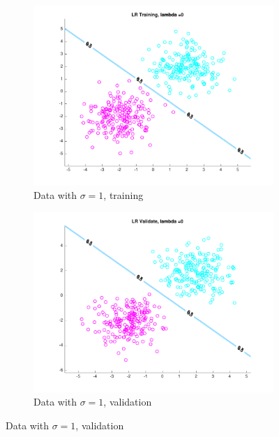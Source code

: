 \begin{figure}[h!]
\centering
    \begin{subfigure}[b]{0.4\textwidth}
	\includegraphics[scale=0.4]{hw2_1_stdev1_a_0.pdf}
	\caption{Data with $\sigma = 1$, training}\label{fig:data_stdev1a}
    \end{subfigure}
    \quad
    \begin{subfigure}[b]{0.4\textwidth}
	\includegraphics[scale=0.4]{hw2_1_stdev1_b_0.pdf}
	\caption{Data with $\sigma = 1$, validation}\label{fig:data_stdev1b}
    \end{subfigure}


\end{figure}
